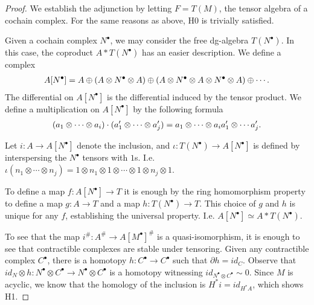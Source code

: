 \documentclass[../thesis.tex]{subfiles}
\begin{document}
            \begin{proof}
                We establish the adjunction by letting $F = T(M)$, the tensor algebra of a cochain complex. For the same reasons as above, H0 is trivially satisfied. 

                Given a cochain complex $N^\bullet$, we may consider the free dg-algebra $T(N^\bullet)$. In this case, the coproduct $A\ast T(N^\bullet)$ has an easier description. We define a complex
                \begin{align*}
                    A[N^\bullet] = A \oplus (A \otimes N^\bullet \otimes A) \oplus (A \otimes N^\bullet \otimes A \otimes N^\bullet \otimes A) \oplus \cdots\tt{.}
                \end{align*}
                The differential on $A[N^\bullet]$ is the differential induced by the tensor product. We define a multiplication on $A[N^\bullet]$ by the following formula
                \begin{align*}
                    (a_1\otimes\cdots\otimes a_i)\cdot(a_1'\otimes\cdots\otimes a_j') = a_1\otimes\cdots\otimes a_ia_1'\otimes\cdots a_j'\tt{.}
                \end{align*}

                Let $i : A \rightarrow A[N^\bullet]$ denote the inclusion, and $\iota : T(N^\bullet) \rightarrow A[N^\bullet]$ is defined by interspersing the $N^\bullet$ tensors with $1$s. I.e. $\iota(n_1\otimes\cdots\otimes n_j) = 1 \otimes n_1 \otimes 1 \otimes \cdots \otimes 1 \otimes n_j \otimes 1$.

                To define a map $f: A[N^\bullet] \rightarrow T$ it is enough by the ring homomorphism property to define a map $g: A \rightarrow T$ and a map $h: T(N^\bullet) \rightarrow T$. This choice of $g$ and $h$ is unique for any $f$, establishing the universal property. I.e. $A[N^\bullet] \simeq A\ast T(N^\bullet)$.
                
                To see that the map $i^\#: A^\# \rightarrow A[M^\bullet]^\#$ is a quasi-isomorphism, it is enough to see that contractible complexes are stable under tensoring. Given any contractible complex $C^\bullet$, there is a homotopy $h: C^\bullet \rightarrow C^\bullet$ such that $\partial h = id_C$. Observe that $id_N\otimes h : N^\bullet\otimes C^\bullet \rightarrow N^\bullet\otimes C^\bullet$ is a homotopy witnessing $id_{N^\bullet\otimes C^\bullet} \sim 0$. Since $M$ is acyclic, we know that the homology of the inclusion is $H^*i = id_{H^*A}$, which shows H1.
            \end{proof}
\end{document}
